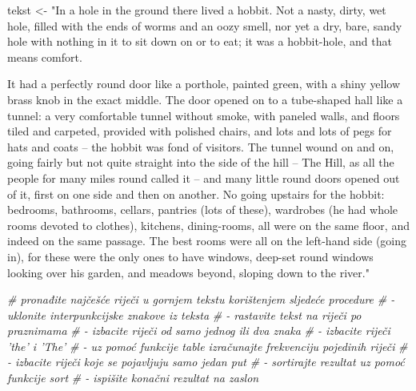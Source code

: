 \documentclass[]{book}
\newenvironment{Shaded}{\begin{snugshade}}{\end{snugshade}}
\newcommand{\StringTok}[1]{\textcolor[rgb]{0.31,0.60,0.02}{#1}}
\newcommand{\CommentTok}[1]{\textcolor[rgb]{0.56,0.35,0.01}{\textit{#1}}}
\newcommand{\NormalTok}[1]{#1}
\theoremstyle{definition}
\theoremstyle{definition}
\theoremstyle{definition}
\theoremstyle{remark}
\begin{document}
\begin{Shaded}
\begin{Highlighting}[]
\NormalTok{tekst <-}\StringTok{ "In a hole in the ground there lived a hobbit. Not a nasty, }
\StringTok{dirty, wet hole, filled with the ends of worms and an oozy smell, nor }
\StringTok{yet a dry, bare, sandy hole with nothing in it to sit down on or to eat; }
\StringTok{it was a hobbit-hole, and that means comfort.}

\StringTok{It had a perfectly round door like a porthole, painted green, with a shiny }
\StringTok{yellow brass knob in the exact middle. The door opened on to a tube-shaped hall }
\StringTok{like a tunnel: a very comfortable tunnel without smoke, with paneled walls, and }
\StringTok{floors tiled and carpeted, provided with polished chairs, and lots and lots }
\StringTok{of pegs for hats and coats – the hobbit was fond of visitors. The tunnel wound }
\StringTok{on and on, going fairly but not quite straight into the side of the hill – The }
\StringTok{Hill, as all the people for many miles round called it – and many little round }
\StringTok{doors opened out of it, first on one side and then on another. No going upstairs }
\StringTok{for the hobbit: bedrooms, bathrooms, cellars, pantries (lots of these), }
\StringTok{wardrobes (he had whole rooms devoted to clothes), kitchens, dining-rooms, }
\StringTok{all were on the same floor, and indeed on the same passage. The best rooms }
\StringTok{were all on the left-hand side (going in), for these were the only ones to have }
\StringTok{windows, deep-set round windows looking over his garden, and meadows beyond, }
\StringTok{sloping down to the river."}


\CommentTok{# pronađite najčešće riječi u gornjem tekstu korištenjem sljedeće procedure}
\CommentTok{# - uklonite interpunkcijske znakove iz teksta}
\CommentTok{# - rastavite tekst na riječi po praznimama}
\CommentTok{# - izbacite riječi od samo jednog ili dva znaka}
\CommentTok{# - izbacite riječi 'the' i 'The'}
\CommentTok{# - uz pomoć funkcije table izračunajte frekvenciju pojedinih riječi}
\CommentTok{# - izbacite riječi koje se pojavljuju samo jedan put}
\CommentTok{# - sortirajte rezultat uz pomoć funkcije sort}
\CommentTok{# - ispišite konačni rezultat na zaslon}
\end{Highlighting}
\end{Shaded}
\end{document}
